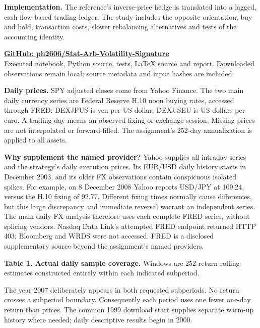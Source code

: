 \documentclass[11pt,letterpaper]{article}
\newcommand{\sectiontitle}[2]{\vspace{3pt}{\color{teal}\sffamily\small #1\par}{\color{navy}\sffamily\Large\bfseries #2\par}\vspace{4pt}}
\begin{document}
\textbf{Implementation.} The reference's inverse-price hedge is translated into a lagged, cash-flow-based trading ledger. The study includes the opposite orientation, buy and hold, transaction costs, slower rebalancing alternatives and tests of the accounting identity.

\vfill
\href{https://github.com/ph2606/Stat-Arb-Volatility-Signature}{\textbf{GitHub: ph2606/Stat-Arb-Volatility-Signature}}\\
Executed notebook, Python source, tests, LaTeX source and report. Downloaded observations remain local; source metadata and input hashes are included.

\clearpage
\sectiontitle{01 / DATA}{Coverage, sources and quality control}
\textbf{Daily prices.} SPY adjusted closes come from Yahoo Finance. The two main daily currency series are Federal Reserve H.10 noon buying rates, accessed through FRED: DEXJPUS is yen per US dollar; DEXUSEU is US dollars per euro. A trading day means an observed fixing or exchange session. Missing prices are not interpolated or forward-filled. The assignment's 252-day annualization is applied to all assets.

\textbf{Why supplement the named provider?} Yahoo supplies all intraday series and the strategy's daily execution prices. Its EUR/USD daily history starts in December 2003, and its older FX observations contain conspicuous isolated spikes. For example, on 8 December 2008 Yahoo reports USD/JPY at 109.24, versus the H.10 fixing of 92.77. Different fixing times normally cause differences, but this large discrepancy and immediate reversal warrant an independent series. The main daily FX analysis therefore uses each complete FRED series, without splicing vendors. Nasdaq Data Link's attempted FRED endpoint returned HTTP 403; Bloomberg and WRDS were not accessed. FRED is a disclosed supplementary source beyond the assignment's named providers.

\textbf{Table 1. Actual daily sample coverage.} Windows are 252-return rolling estimates constructed entirely within each indicated subperiod.
\begin{center}\small\end{center}
The year 2007 deliberately appears in both requested subperiods. No return crosses a subperiod boundary. Consequently each period uses one fewer one-day return than prices. The common 1999 download start supplies separate warm-up history where needed; daily descriptive results begin in 2000.
\end{document}
